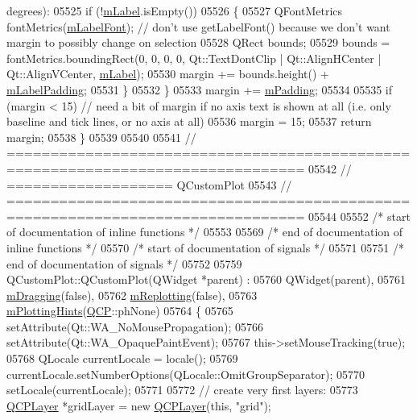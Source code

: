 \begin{DoxyCode}
{       degrees):}
05525     \textcolor{keywordflow}{if} (!\hyperlink{a00025_ae8001dbdfc47685c1cf7b98b044460e6}{mLabel}.isEmpty())
05526     \{
05527       QFontMetrics fontMetrics(\hyperlink{a00025_a37442d470e30e19b81ecaf979a34d046}{mLabelFont}); \textcolor{comment}{// don't use getLabelFont() because we don't want
       margin to possibly change on selection}
05528       QRect bounds;
05529       bounds = fontMetrics.boundingRect(0, 0, 0, 0, Qt::TextDontClip | Qt::AlignHCenter | Qt::AlignVCenter,
       \hyperlink{a00025_ae8001dbdfc47685c1cf7b98b044460e6}{mLabel});
05530       margin += bounds.height() + \hyperlink{a00025_ae392a7c1a88a58765a7ed899642d248a}{mLabelPadding};
05531     \}
05532   \}
05533   margin += \hyperlink{a00025_a52a805a4f03231210e0880db7f77e098}{mPadding};
05534   
05535   \textcolor{keywordflow}{if} (margin < 15) \textcolor{comment}{// need a bit of margin if no axis text is shown at all (i.e. only baseline and tick
       lines, or no axis at all)}
05536     margin = 15;
05537   \textcolor{keywordflow}{return} margin;
05538 \}
05539 
05540 
05541 \textcolor{comment}{// ================================================================================}
05542 \textcolor{comment}{// =================== QCustomPlot}
05543 \textcolor{comment}{// ================================================================================}
05544 
05552 \textcolor{comment}{/* start of documentation of inline functions */}
05553 
05569 \textcolor{comment}{/* end of documentation of inline functions */}
05570 \textcolor{comment}{/* start of documentation of signals */}
05571 
05751 \textcolor{comment}{/* end of documentation of signals */}
05752 
05759 QCustomPlot::QCustomPlot(QWidget *parent) :
05760   QWidget(parent),
05761   \hyperlink{a00116_ad1273fad7e12b0f61819343368778928}{mDragging}(false),
05762   \hyperlink{a00116_a38ce5778fc22072b64b7ccc05963c684}{mReplotting}(false),
05763   \hyperlink{a00116_af6de5d56e261af21cf6223179fc58883}{mPlottingHints}(\hyperlink{a00143}{QCP}::phNone)
05764 \{
05765   setAttribute(Qt::WA\_NoMousePropagation);
05766   setAttribute(Qt::WA\_OpaquePaintEvent);
05767   this->setMouseTracking(\textcolor{keyword}{true});
05768   QLocale currentLocale = locale();
05769   currentLocale.setNumberOptions(QLocale::OmitGroupSeparator);
05770   setLocale(currentLocale);
05771   
05772   \textcolor{comment}{// create very first layers:}
05773   \hyperlink{a00043}{QCPLayer} *gridLayer = \textcolor{keyword}{new} \hyperlink{a00116_a5dbf96bf7664c1b6fce49063eeea6eef}{QCPLayer}(\textcolor{keyword}{this}, \textcolor{stringliteral}{"grid"});

\end{DoxyCode}
